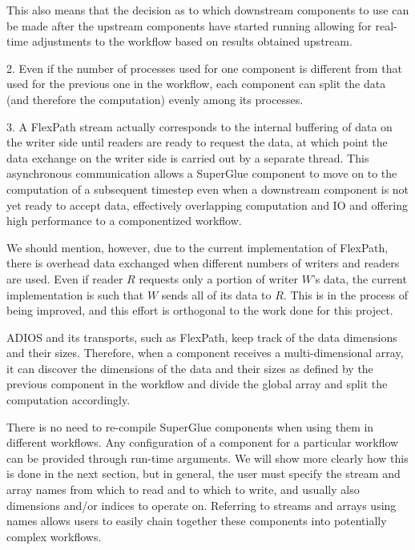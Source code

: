 This also means that the decision as to
which downstream components to use can be made after
the upstream components have started
running allowing for real-time adjustments to the
workflow based on results obtained upstream.
\fi

2. Even if the number of processes used for one
component is different from that used for the previous
one in the workflow, each component can split the data
(and therefore the computation) evenly among its processes.

3. A FlexPath stream actually corresponds
to the internal buffering of data on the writer side
until readers are ready to request the data,
at which point the data exchange
on the writer side is carried out
by a separate thread.
This asynchronous communication allows a 
SuperGlue component to move on to the computation
of a subsequent timestep even when a downstream
component is not yet ready to accept data,
effectively overlapping computation and IO
and offering high performance to a componentized workflow.

We should mention, however, due to the current implementation of FlexPath, there is overhead
data exchanged when different numbers of writers and readers are used. Even if
reader $R$ requests only a portion of writer $W$'s data, the current implementation
is such that $W$ sends all of its data to $R$. This is in the process of being
improved, and this effort is orthogonal to the work done for this project.
\fi

ADIOS and its transports, such as FlexPath,
keep track of the
data dimensions and their sizes. Therefore, when a
component receives a
multi-dimensional array, it can discover the dimensions
of the data and their
sizes as defined by the previous component
in the workflow and divide the global array
and split the computation accordingly.

There is no need to re-compile SuperGlue components when using them
in different workflows. Any configuration
of a component for a particular workflow
can be provided through run-time arguments.
We will show more clearly how this is done in the next section,
but in general, the user must specify the
stream and array names from which to read
and to which to write,
and usually also dimensions and/or
indices to operate on.
Referring to
streams and arrays using names allows users to
easily chain together these
components into potentially complex workflows.

\fi
